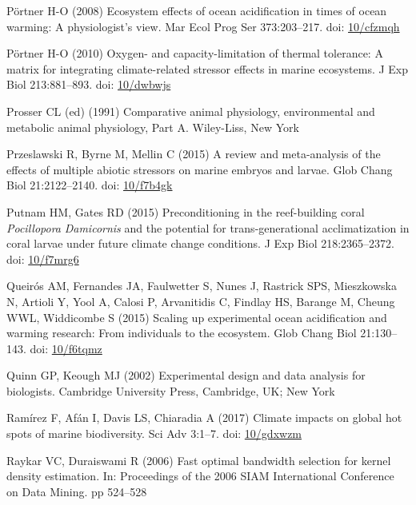 \documentclass[a4paper,10pt, oneside]{memoir}
\begin{document}
\leavevmode\hypertarget{ref-Portner2008}{}%
Pörtner H-O (2008) Ecosystem effects of ocean acidification in times of ocean warming: A physiologist's view. Mar Ecol Prog Ser 373:203--217. doi: \href{https://doi.org/10/cfzmqh}{10/cfzmqh}

\leavevmode\hypertarget{ref-Portner2010}{}%
Pörtner H-O (2010) Oxygen- and capacity-limitation of thermal tolerance: A matrix for integrating climate-related stressor effects in marine ecosystems. J Exp Biol 213:881--893. doi: \href{https://doi.org/10/dwbwjs}{10/dwbwjs}

\leavevmode\hypertarget{ref-Prosser1991}{}%
Prosser CL (ed) (1991) Comparative animal physiology, environmental and metabolic animal physiology, Part A. Wiley-Liss, New York

\leavevmode\hypertarget{ref-Przeslawski2015}{}%
Przeslawski R, Byrne M, Mellin C (2015) A review and meta-analysis of the effects of multiple abiotic stressors on marine embryos and larvae. Glob Chang Biol 21:2122--2140. doi: \href{https://doi.org/10/f7b4gk}{10/f7b4gk}

\leavevmode\hypertarget{ref-Putnam2015}{}%
Putnam HM, Gates RD (2015) Preconditioning in the reef-building coral \emph{Pocillopora} \emph{Damicornis} and the potential for trans-generational acclimatization in coral larvae under future climate change conditions. J Exp Biol 218:2365--2372. doi: \href{https://doi.org/10/f7mrg6}{10/f7mrg6}

\leavevmode\hypertarget{ref-Queiros2015}{}%
Queirós AM, Fernandes JA, Faulwetter S, Nunes J, Rastrick SPS, Mieszkowska N, Artioli Y, Yool A, Calosi P, Arvanitidis C, Findlay HS, Barange M, Cheung WWL, Widdicombe S (2015) Scaling up experimental ocean acidification and warming research: From individuals to the ecosystem. Glob Chang Biol 21:130--143. doi: \href{https://doi.org/10/f6tqmz}{10/f6tqmz}

\leavevmode\hypertarget{ref-Quinn2002}{}%
Quinn GP, Keough MJ (2002) Experimental design and data analysis for biologists. Cambridge University Press, Cambridge, UK; New York

\leavevmode\hypertarget{ref-Ramirez2017}{}%
Ramírez F, Afán I, Davis LS, Chiaradia A (2017) Climate impacts on global hot spots of marine biodiversity. Sci Adv 3:1--7. doi: \href{https://doi.org/10/gdxwzm}{10/gdxwzm}

\leavevmode\hypertarget{ref-Raykar2006}{}%
Raykar VC, Duraiswami R (2006) Fast optimal bandwidth selection for kernel density estimation. In: Proceedings of the 2006 SIAM International Conference on Data Mining. pp 524--528
\end{document}
